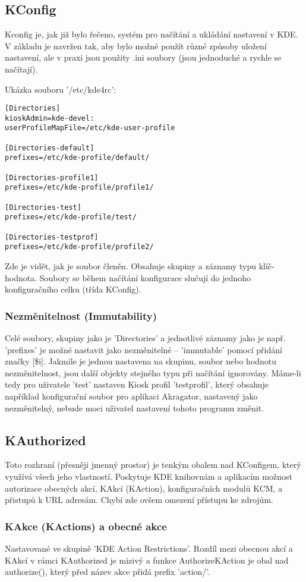 \subsection{KConfig}
Kconfig je, jak již bylo řečeno, systém pro načítání a ukládání nastavení v KDE.
V základu je navržen tak, aby bylo možné použít různé způsoby uložení nastavení,
ale v praxi jsou použity .ini soubory (jsou jednoduché a rychle se načítají).

Ukázka souboru '/etc/kde4rc':
\begin{verbatim}
[Directories]
kioskAdmin=kde-devel:
userProfileMapFile=/etc/kde-user-profile

[Directories-default]
prefixes=/etc/kde-profile/default/

[Directories-profile1]
prefixes=/etc/kde-profile/profile1/

[Directories-test]
prefixes=/etc/kde-profile/test/

[Directories-testprof]
prefixes=/etc/kde-profile/profile2/
\end{verbatim}
Zde je vidět, jak je soubor členěn. Obsahuje skupiny a záznamy typu
klíč-hodnota. Soubory se během načítání konfigurace slučují do jednoho
konfiguračního celku
(třída KConfig).

\subsubsection{Nezměnitelnost (Immutability)}
Celé soubory, skupiny jako je 'Directories' a jednotlivé záznamy jako je např.
'prefixes' je možné nastavit jako nezměnitelné -- 'immutable' pomocí přidání
značky [\$i].
Jakmile je jednou nastavena na skupinu, soubor nebo hodnotu nezměnitelnost, jsou
další objekty stejného typu při načítání ignorovány. Máme-li tedy pro uživatele
'test' nastaven Kiosk profil 'testprofil', který obsahuje například konfigurační
soubor pro aplikaci Akragator, nastavený jako nezměnitelný, nebude moci uživatel
nastavení tohoto programu změnit.

\subsection{KAuthorized}
Toto rozhraní (přesněji jmenný prostor) je tenkým obalem nad KConfigem, který
využívá všech jeho vlastností. Poskytuje KDE knihovnám a aplikacím možnost
autorizace obecných akcí, KAkcí (KAction), konfiguračních modulů KCM, a přistupů
k URL adresám.
Chybí zde ovšem omezení přístupu ke zdrojům.
\subsubsection{KAkce (KActions) a obecné akce}
Nastavované ve skupině 'KDE Action Restrictions'.
Rozdíl mezi obecnou akcí a KAkcí v rámci KAuthorized je mizivý a funkce
AuthorizeKAction je obal nad authorize(), který před název akce přidá prefix
'action/'.

